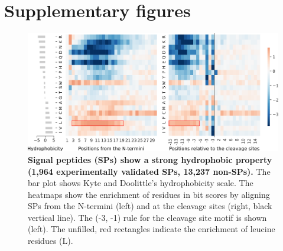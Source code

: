 
\section{Supplementary figures}
\begin{figure}[htbp!]
\center
\includegraphics[width=1\textwidth]{appendix/Razor/Figs/figS1_bitscore_heatmap.png}
\caption[Signal peptides (SPs) show a strong hydrophobic property (1,964 experimentally validated SPs, 13,237 non-SPs).]{\textbf{ Signal peptides (SPs) show a strong hydrophobic property (1,964 experimentally validated SPs, 13,237 non-SPs). }  The bar plot shows Kyte and Doolittle’s hydrophobicity scale. The heatmaps show the enrichment of residues in bit scores by aligning SPs from the N-termini (left) and at the cleavage sites (right, black vertical line). The (-3, -1) rule for the cleavage site motif is shown (left). The unfilled, red rectangles indicate the enrichment of leucine residues (L).
}%
\label{fig:appendix_razor_S1}
\end{figure}


